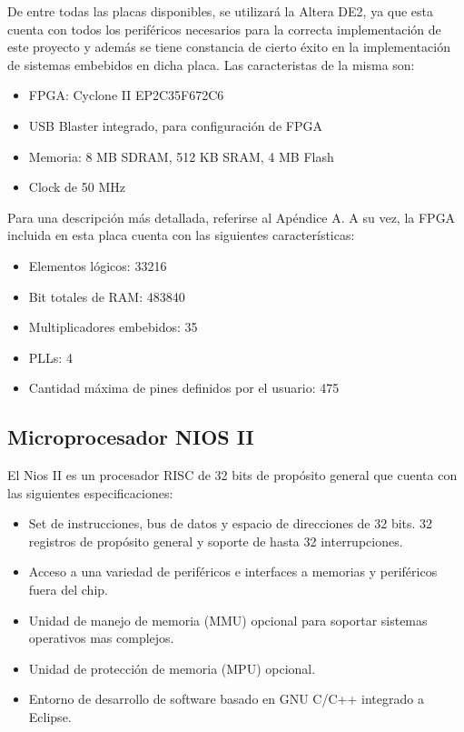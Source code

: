 De entre todas las placas disponibles, se utilizará la Altera DE2, ya que esta cuenta con todos los periféricos necesarios para la correcta implementación de este proyecto y además se tiene constancia de cierto éxito en la implementación de sistemas embebidos en dicha placa. Las caracteristas de la misma son:

\begin{itemize}
	\item FPGA: Cyclone II EP2C35F672C6
	\item USB Blaster integrado, para configuración de FPGA
	\item Memoria: 8 MB SDRAM, 512 KB SRAM, 4 MB Flash
	\item Clock de 50 MHz
\end{itemize}

Para una descripción más detallada, referirse al Apéndice A. A su vez, la FPGA incluida en esta placa cuenta con las siguientes características:

\begin{itemize}
	\item Elementos lógicos: 33216
	\item Bit totales de RAM: 483840
	\item Multiplicadores embebidos: 35
	\item PLLs: 4
	\item Cantidad máxima de pines definidos por el usuario: 475
\end{itemize}


\subsection{Microprocesador NIOS II}
El Nios II es un procesador RISC de 32 bits de propósito general que cuenta con las siguientes especificaciones:
\begin{itemize}
	\item Set de instrucciones, bus de datos y espacio de direcciones de 32 bits. 32 registros de propósito general y soporte de hasta 32 interrupciones.
	\item Acceso a una variedad de periféricos e interfaces a memorias y periféricos fuera del chip.
	\item Unidad de manejo de memoria (MMU) opcional para soportar sistemas operativos mas complejos.
	\item Unidad de protección de memoria (MPU) opcional.
	\item Entorno de desarrollo de software basado en GNU C/C++ integrado a Eclipse.
\end{itemize}

